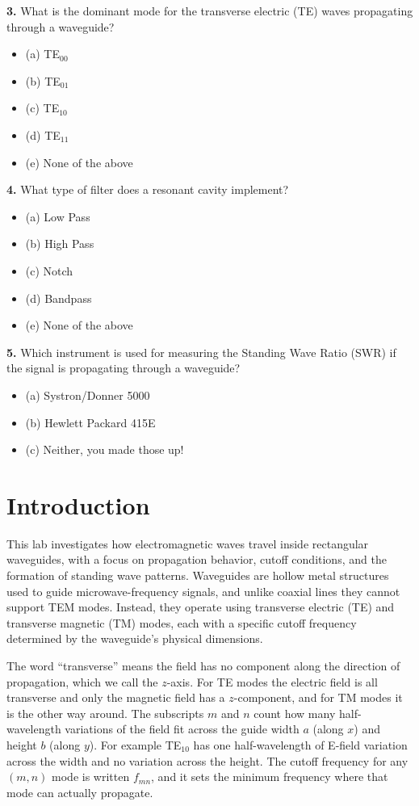 \documentclass[11pt,letterpaper]{article}
\newcommand{\hl}[1]{\colorbox{answerhl}{#1}}
\begin{document}
\textbf{3.} What is the dominant mode for the transverse electric (TE) waves propagating through a waveguide?
\begin{itemize}[label={},leftmargin=2em,itemsep=0pt]
  \item (a) TE$_{00}$
  \item (b) TE$_{01}$
  \item \hl{(c) TE$_{10}$}
  \item (d) TE$_{11}$
  \item (e) None of the above
\end{itemize}

\textbf{4.} What type of filter does a resonant cavity implement?
\begin{itemize}[label={},leftmargin=2em,itemsep=0pt]
  \item (a) Low Pass
  \item (b) High Pass
  \item (c) Notch
  \item \hl{(d) Bandpass}
  \item (e) None of the above
\end{itemize}

\textbf{5.} Which instrument is used for measuring the Standing Wave Ratio (SWR) if the signal is propagating through a waveguide?
\begin{itemize}[label={},leftmargin=2em,itemsep=0pt]
  \item (a) Systron/Donner 5000
  \item \hl{(b) Hewlett Packard 415E}
  \item (c) Neither, you made those up!
\end{itemize}

\newpage

\section{Introduction}

This lab investigates how electromagnetic waves travel inside rectangular waveguides, with a focus on propagation behavior, cutoff conditions, and the formation of standing wave patterns. Waveguides are hollow metal structures used to guide microwave-frequency signals, and unlike coaxial lines they cannot support TEM modes. Instead, they operate using transverse electric (TE) and transverse magnetic (TM) modes, each with a specific cutoff frequency determined by the waveguide's physical dimensions.

The word ``transverse'' means the field has no component along the direction of propagation, which we call the $z$-axis. For TE modes the electric field is all transverse and only the magnetic field has a $z$-component, and for TM modes it is the other way around. The subscripts $m$ and $n$ count how many half-wavelength variations of the field fit across the guide width $a$ (along $x$) and height $b$ (along $y$). For example TE$_{10}$ has one half-wavelength of E-field variation across the width and no variation across the height. The cutoff frequency for any $(m,n)$ mode is written $f_{mn}$, and it sets the minimum frequency where that mode can actually propagate.
\end{document}
